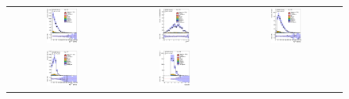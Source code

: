 \begin{figure}[h!]
\begin{center}
\begin{tabular}{ccc}
%
\includegraphics[width=0.30\textwidth]{appendices/figures/sdrs/LepPt_ELEMUONCR5_1W_NOMINAL.eps} &
\includegraphics[width=0.30\textwidth]{appendices/figures/sdrs/LepEta_ELEMUONCR5_1W_NOMINAL.eps} &
\includegraphics[width=0.30\textwidth]{appendices/figures/sdrs/MET_ELEMUONCR5_1W_NOMINAL.eps} \\
\includegraphics[width=0.30\textwidth]{appendices/figures/sdrs/Wlep_MassT_ELEMUONCR5_1W_NOMINAL.eps} &
\includegraphics[width=0.30\textwidth]{appendices/figures/sdrs/Njets25_ELEMUONCR5_1W_NOMINAL.eps}  &

\end{tabular}
\end{center}
\end{figure}
